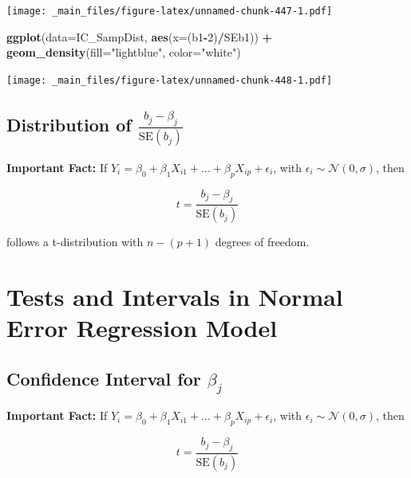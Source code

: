 \documentclass[]{book}
\newenvironment{Shaded}{\begin{snugshade}}{\end{snugshade}}
\newcommand{\KeywordTok}[1]{\textcolor[rgb]{0.13,0.29,0.53}{\textbf{#1}}}
\newcommand{\DataTypeTok}[1]{\textcolor[rgb]{0.13,0.29,0.53}{#1}}
\newcommand{\DecValTok}[1]{\textcolor[rgb]{0.00,0.00,0.81}{#1}}
\newcommand{\StringTok}[1]{\textcolor[rgb]{0.31,0.60,0.02}{#1}}
\newcommand{\OperatorTok}[1]{\textcolor[rgb]{0.81,0.36,0.00}{\textbf{#1}}}
\newcommand{\NormalTok}[1]{#1}
\begin{document}
\texttt{[image: \_main\_files/figure-latex/unnamed-chunk-447-1.pdf]}

\begin{Shaded}
\begin{Highlighting}[]
\KeywordTok{ggplot}\NormalTok{(}\DataTypeTok{data=}\NormalTok{IC_SampDist, }\KeywordTok{aes}\NormalTok{(}\DataTypeTok{x=}\NormalTok{(b1}\OperatorTok{-}\DecValTok{2}\NormalTok{)}\OperatorTok{/}\NormalTok{SEb1)) }\OperatorTok{+}\StringTok{ }
\StringTok{  }\KeywordTok{geom_density}\NormalTok{(}\DataTypeTok{fill=}\StringTok{"lightblue"}\NormalTok{, }\DataTypeTok{color=}\StringTok{"white"}\NormalTok{)}
\end{Highlighting}
\end{Shaded}

\texttt{[image: \_main\_files/figure-latex/unnamed-chunk-448-1.pdf]}

\subsection{\texorpdfstring{Distribution of
\(\frac{{b_j}-\beta_j}{\text{SE}(b_j)}\)}{Distribution of \textbackslash{}frac\{\{b\_j\}-\textbackslash{}beta\_j\}\{\textbackslash{}text\{SE\}(b\_j)\}}}\label{distribution-of-fracb_j-beta_jtextseb_j}

\textbf{Important Fact:} If
\(Y_i = \beta_0 + \beta_1X_{i1}+ \ldots + \beta_pX_{ip} + \epsilon_i\),
with \(\epsilon_i\sim\mathcal{N}(0,\sigma)\), then

\[
t= \frac{{b_j}-\beta_j}{\text{SE}(b_j)}  
\]

follows a t-distribution with \(n-(p+1)\) degrees of freedom.

\section{Tests and Intervals in Normal Error Regression
Model}\label{tests-and-intervals-in-normal-error-regression-model}

\subsection{\texorpdfstring{Confidence Interval for
\(\beta_j\)}{Confidence Interval for \textbackslash{}beta\_j}}\label{confidence-interval-for-beta_j}

\textbf{Important Fact:} If
\(Y_i = \beta_0 + \beta_1X_{i1}+ \ldots + \beta_pX_{ip} + \epsilon_i\),
with \(\epsilon_i\sim\mathcal{N}(0,\sigma)\), then

\[
t= \frac{{b_j}-\beta_j}{\text{SE}(b_j)}  
\]
\end{document}
